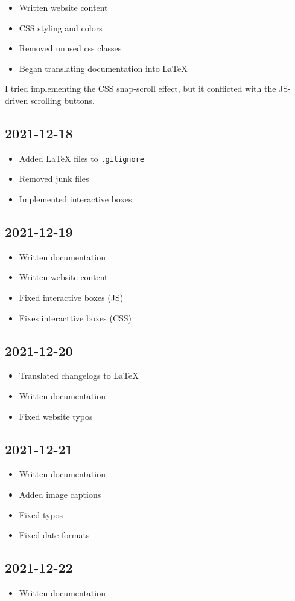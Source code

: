 \documentclass{article}
\begin{document}
\begin{itemize}
    \item Written website content
    \item CSS styling and colors
    \item Removed unused css classes
    \item Began translating documentation into LaTeX
\end{itemize}

I tried implementing the CSS snap-scroll effect,
but it conflicted with the JS-driven scrolling buttons.

\subsection*{2021-12-18}

\begin{itemize}
    \item Added LaTeX files to \texttt{.gitignore}
    \item Removed junk files
    \item Implemented interactive boxes
\end{itemize} %

\subsection*{2021-12-19}

\begin{itemize}
    \item Written documentation
    \item Written website content
    \item Fixed interactive boxes (JS)
    \item Fixes interacttive boxes (CSS)
\end{itemize} %

\subsection*{2021-12-20}

\begin{itemize}
    \item Translated changelogs to LaTeX
    \item Written documentation
    \item Fixed website typos
\end{itemize}

\subsection*{2021-12-21}

\begin{itemize}
    \item Written documentation
    \item Added image captions
    \item Fixed typos
    \item Fixed date formats
\end{itemize}

\subsection*{2021-12-22}

\begin{itemize}
    \item Written documentation
\end{itemize}
\end{document}
